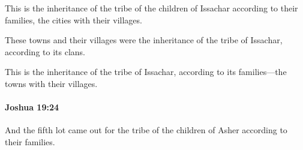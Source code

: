 			\begin{versebox}
					\item[BHS] 
					\item[ASV] This is the inheritance of the tribe of the children of Issachar according to their families, the cities with their villages.
					\item[NIV] These towns and their villages were the inheritance of the tribe of Issachar, according to its clans.
					\item[NRSV] This is the inheritance of the tribe of Issachar, according to its families—the towns with their villages.
			\end{versebox}

		\paragraph{Joshua 19:24} %
			\label{JOSHUA-19-24}

			And the fifth lot came out for the tribe of the children of Asher according to their families.

